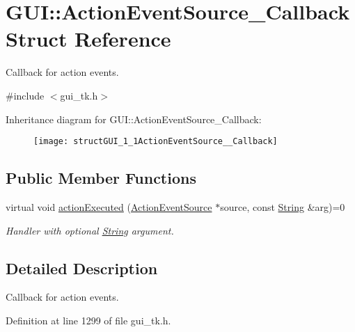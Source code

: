 \hypertarget{structGUI_1_1ActionEventSource__Callback}{\section{G\-U\-I\-:\-:Action\-Event\-Source\-\_\-\-Callback Struct Reference}
\label{structGUI_1_1ActionEventSource__Callback}
}


Callback for action events.  




{\ttfamily \#include $<$gui\-\_\-tk.\-h$>$}

Inheritance diagram for G\-U\-I\-:\-:Action\-Event\-Source\-\_\-\-Callback\-:\begin{figure}[H]
\begin{center}
\leavevmode
\texttt{[image: structGUI\_1\_1ActionEventSource\_\_Callback]}
\end{center}
\end{figure}
\subsection*{Public Member Functions}
\begin{DoxyCompactItemize}
\item 
virtual void \hyperlink{structGUI_1_1ActionEventSource__Callback_a36df23a424558a83b45e3e3d5c175cf2}{action\-Executed} (\hyperlink{classGUI_1_1ActionEventSource}{Action\-Event\-Source} $\ast$source, const \hyperlink{classGUI_1_1String}{String} \&arg)=0
\begin{DoxyCompactList}\small\item\em Handler with optional \hyperlink{classGUI_1_1String}{String} argument. \end{DoxyCompactList}\end{DoxyCompactItemize}


\subsection{Detailed Description}
Callback for action events. 

Definition at line 1299 of file gui\-\_\-tk.\-h.



